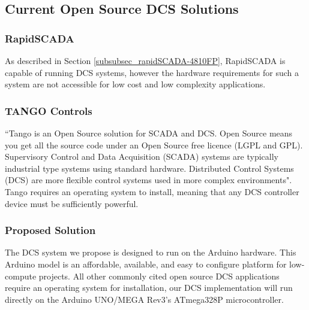 \documentclass[../main.tex]{subfiles}
\begin{document}
\subsection{Current Open Source DCS Solutions}

\subsubsection{RapidSCADA}
\par As described in Section \ref{subsubsec_rapidSCADA-4810FP}, RapidSCADA\cite{b5} is capable of running DCS systems, however the hardware requirements for such a system are not accessible for low cost and low complexity applications.

\subsubsection{TANGO Controls}
\par ``Tango is an Open Source solution for SCADA and DCS. Open Source means you get all the source code under an Open Source free licence (LGPL and GPL). Supervisory Control and Data Acquisition (SCADA) systems are typically industrial type systems using standard hardware. Distributed Control Systems (DCS) are more flexible control systems used in more complex environments"\cite{b7}. Tango requires an operating system to install, meaning that any DCS controller device must be sufficiently powerful.

\subsubsection{Proposed Solution}
\par The DCS system we propose is designed to run on the Arduino hardware. This Arduino model is an affordable, available, and easy to configure platform for low-compute projects. All other commonly cited open source DCS applications require an operating system for installation, our DCS implementation will run directly on the Arduino UNO/MEGA Rev3's ATmega328P microcontroller.
\end{document}
